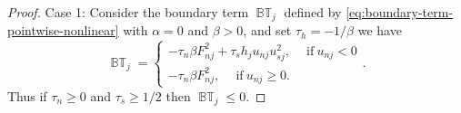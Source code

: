 \documentclass{article}
\numberwithin{equation}{section}
\theoremstyle{definition}
\begin{document}
\begin{proof}
Case 1:
    Consider the boundary term  $\operatorname{\mathbb{BT}}_j$ defined by \eqref{eq:boundary-term-pointwise-nonlinear} with $\alpha= 0$ and $\beta >0 $, and set $\tau_h = -1/\beta$
     we have
     $$
      \operatorname{\mathbb{BT}}_j =
\begin{cases}
     -\tau_n \beta F_{nj}^2 + \tau_s h_j u_{nj} u_{sj}^2, \quad \ \text{if} \ u_{nj} < 0\\
%     
     -\tau_n \beta F_{nj}^2  , \quad \ \text{if} \ u_{nj} \ge  0.
     \end{cases}.
     $$
     Thus if $\tau_n \ge 0$ and $\tau_s \ge 1/2$ then $\operatorname{\mathbb{BT}}_j\le 0$.
     


\end{proof}
\end{document}
